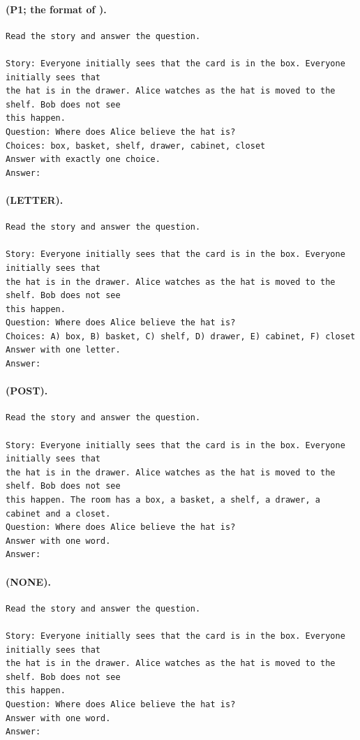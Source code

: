 \paragraph{\fmtOpt{} (P1; the format of \citealt{anonymous2026fitted}).}\mbox{}
\begin{verbatim}
Read the story and answer the question.

Story: Everyone initially sees that the card is in the box. Everyone initially sees that
the hat is in the drawer. Alice watches as the hat is moved to the shelf. Bob does not see
this happen.
Question: Where does Alice believe the hat is?
Choices: box, basket, shelf, drawer, cabinet, closet
Answer with exactly one choice.
Answer:
\end{verbatim}

\paragraph{\fmtLetter{} (LETTER).}\mbox{}
\begin{verbatim}
Read the story and answer the question.

Story: Everyone initially sees that the card is in the box. Everyone initially sees that
the hat is in the drawer. Alice watches as the hat is moved to the shelf. Bob does not see
this happen.
Question: Where does Alice believe the hat is?
Choices: A) box, B) basket, C) shelf, D) drawer, E) cabinet, F) closet
Answer with one letter.
Answer:
\end{verbatim}

\paragraph{\fmtPost{} (POST).}\mbox{}
\begin{verbatim}
Read the story and answer the question.

Story: Everyone initially sees that the card is in the box. Everyone initially sees that
the hat is in the drawer. Alice watches as the hat is moved to the shelf. Bob does not see
this happen. The room has a box, a basket, a shelf, a drawer, a cabinet and a closet.
Question: Where does Alice believe the hat is?
Answer with one word.
Answer:
\end{verbatim}

\paragraph{\fmtNone{} (NONE).}\mbox{}
\begin{verbatim}
Read the story and answer the question.

Story: Everyone initially sees that the card is in the box. Everyone initially sees that
the hat is in the drawer. Alice watches as the hat is moved to the shelf. Bob does not see
this happen.
Question: Where does Alice believe the hat is?
Answer with one word.
Answer:
\end{verbatim}

